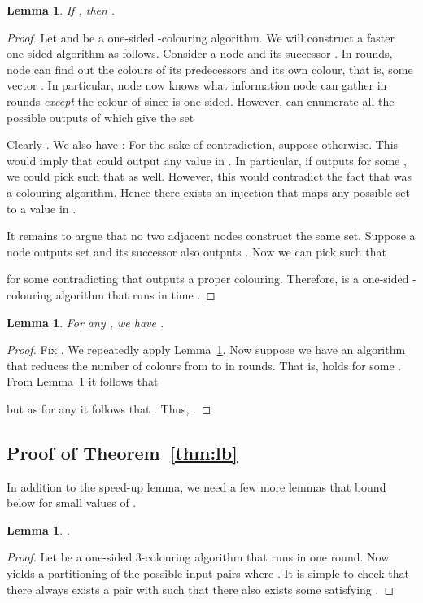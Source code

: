 \documentclass[a4paper,11pt]{article}
\newtheorem{lemma}[theorem]{Lemma}
\theoremstyle{remark}
\begin{document}
\begin{lemma}\label{lemma:speedup}
 If , then .
\end{lemma}
\begin{proof}
 Let  and  be a one-sided -colouring algorithm. We will construct a faster one-sided algorithm  as follows. Consider a node  and its successor . In  rounds, node  can find out the colours of its  predecessors and its own colour, that is, some vector . In particular, node  now knows what information node  can gather in  rounds \emph{except} the colour of  since  is one-sided. However,  can enumerate all the possible outputs of  which give the set

Clearly . We also have : For the sake of contradiction, suppose otherwise. This would imply that  could output any value in . In particular, if  outputs  for some , we could pick  such that  as well. However, this would contradict the fact that  was a colouring algorithm. Hence there exists an injection  that maps any possible set  to a value in . 

It remains to argue that no two adjacent nodes construct the same set. Suppose a node  outputs set  and its successor  also outputs . Now we can pick  such that 

for some  contradicting that  outputs a proper colouring. Therefore,  is a one-sided -colouring algorithm that runs in time .
\end{proof}

\begin{lemma}\label{lemma:rounds}
For any , we have .
\end{lemma}
\begin{proof}
Fix . We repeatedly apply Lemma~\ref{lemma:speedup}. Now suppose we have an algorithm that reduces the number of colours from  to  in  rounds. That is,  holds for some . From Lemma~\ref{lemma:speedup} it follows that

but as  for any  it follows that . Thus, .
\end{proof}

\subsection{Proof of Theorem~\ref{thm:lb}}

In addition to the speed-up lemma, we need a few more lemmas that bound  below for small values of .

\begin{lemma}\label{lemma:4to3}
 .
\end{lemma}
\begin{proof}
 Let  be a one-sided 3-colouring algorithm that runs in one round. Now  yields a partitioning of the possible input pairs  where . It is simple to check that there always exists a pair  with  such that there also exists some  satisfying .
\end{proof}
\end{document}
